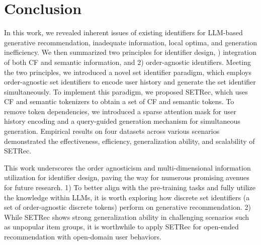 \section{Conclusion}\label{sec:conclusion}
In this work, we revealed inherent issues of existing identifiers for LLM-based generative recommendation, \ie inadequate information, local optima, and generation inefficiency.    
We then summarized two principles for identifier design, ) integration of both CF and semantic information, and 2) order-agnostic identifiers. 
Meeting the two principles, we introduced a novel set identifier paradigm, which employs order-agnostic set identifiers to encode user history and generate the set identifier simultaneously. 
To implement this paradigm, we proposed SETRec, which uses CF and semantic tokenizers to obtain a set of CF and semantic tokens. 
To remove token dependencies, we introduced a sparse attention mask for user history encoding and a query-guided generation mechanism for simultaneous generation. 
Empirical results on four datasets across various scenarios demonstrated the effectiveness, efficiency, generalization ability, and scalability of SETRec. 

This work underscores the order agnosticism and multi-dimensional information utilization for identifier design, paving the way for numerous promising avenues for future research. 
% 
1) To better align with the pre-training tasks and fully utilize the knowledge within LLMs, it is worth exploring how discrete set identifiers (\ie a set of order-agnostic discrete tokens) perform on generative recommendation. 
2) While SETRec shows strong generalization ability in challenging scenarios such as unpopular item groups, it is worthwhile to apply SETRec for open-ended recommendation with open-domain user behaviors. 
